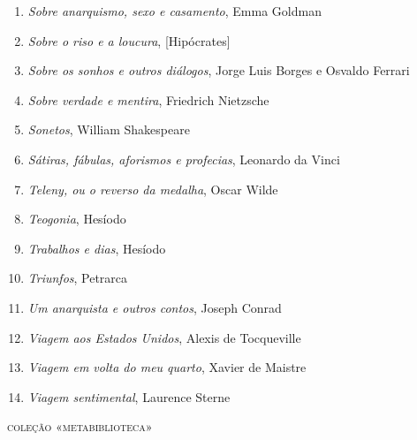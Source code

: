 \begin{enumerate}
\item \textit{Sobre anarquismo, sexo e casamento}, Emma Goldman
\item \textit{Sobre o riso e a loucura}, [Hipócrates]
\item \textit{Sobre os sonhos e outros diálogos}, Jorge Luis Borges e Osvaldo Ferrari
\item \textit{Sobre verdade e mentira}, Friedrich Nietzsche
\item \textit{Sonetos}, William Shakespeare
\item \textit{Sátiras, fábulas, aforismos e profecias}, Leonardo da Vinci
\item \textit{Teleny, ou o reverso da medalha}, Oscar Wilde
\item \textit{Teogonia}, Hesíodo
\item \textit{Trabalhos e dias}, Hesíodo
\item \textit{Triunfos}, Petrarca
\item \textit{Um anarquista e outros contos}, Joseph Conrad
\item \textit{Viagem aos Estados Unidos}, Alexis de Tocqueville
\item \textit{Viagem em volta do meu quarto}, Xavier de Maistre 
\item \textit{Viagem sentimental}, Laurence Sterne
\end{enumerate}

{\large\textsc{coleção «metabiblioteca»}}

